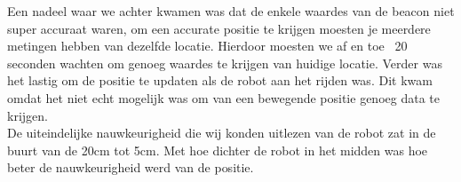 Een nadeel waar we achter kwamen was dat de enkele waardes van de beacon niet super accuraat waren, om een accurate positie te krijgen moesten je meerdere metingen hebben van dezelfde locatie. Hierdoor moesten we af en toe ~20 seconden wachten om genoeg waardes te krijgen van huidige locatie. Verder was het lastig om de positie te updaten als de robot aan het rijden was. Dit kwam omdat het niet echt mogelijk was om van een bewegende positie genoeg data te krijgen.\\

De uiteindelijke nauwkeurigheid die wij konden uitlezen van de robot zat in de buurt van de 20cm tot 5cm. Met hoe dichter de robot in het midden was hoe beter de nauwkeurigheid werd van de positie.


